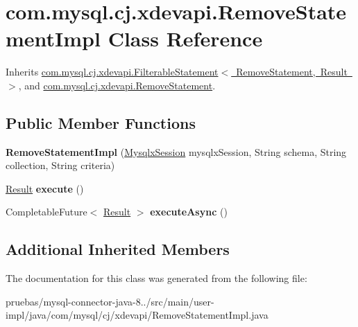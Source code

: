 \hypertarget{classcom_1_1mysql_1_1cj_1_1xdevapi_1_1_remove_statement_impl}{}\section{com.\+mysql.\+cj.\+xdevapi.\+Remove\+Statement\+Impl Class Reference}
\label{classcom_1_1mysql_1_1cj_1_1xdevapi_1_1_remove_statement_impl}


Inherits \mbox{\hyperlink{classcom_1_1mysql_1_1cj_1_1xdevapi_1_1_filterable_statement}{com.\+mysql.\+cj.\+xdevapi.\+Filterable\+Statement$<$ Remove\+Statement, Result $>$}}, and \mbox{\hyperlink{interfacecom_1_1mysql_1_1cj_1_1xdevapi_1_1_remove_statement}{com.\+mysql.\+cj.\+xdevapi.\+Remove\+Statement}}.

\subsection*{Public Member Functions}
\begin{DoxyCompactItemize}
\item 
\mbox{\label{classcom_1_1mysql_1_1cj_1_1xdevapi_1_1_remove_statement_impl_a0e5e4d0e84f24a40869bc4034d64c7b7}} 
{\bfseries Remove\+Statement\+Impl} (\mbox{\hyperlink{classcom_1_1mysql_1_1cj_1_1_mysqlx_session}{Mysqlx\+Session}} mysqlx\+Session, String schema, String collection, String criteria)
\item 
\mbox{\label{classcom_1_1mysql_1_1cj_1_1xdevapi_1_1_remove_statement_impl_aa364f7ecdcdf0a105229018ffe0bcc31}} 
\mbox{\hyperlink{interfacecom_1_1mysql_1_1cj_1_1xdevapi_1_1_result}{Result}} {\bfseries execute} ()
\item 
\mbox{\label{classcom_1_1mysql_1_1cj_1_1xdevapi_1_1_remove_statement_impl_a3f4fc42cc10759bca1c9221d132a6858}} 
Completable\+Future$<$ \mbox{\hyperlink{interfacecom_1_1mysql_1_1cj_1_1xdevapi_1_1_result}{Result}} $>$ {\bfseries execute\+Async} ()
\end{DoxyCompactItemize}
\subsection*{Additional Inherited Members}


The documentation for this class was generated from the following file\+:\begin{DoxyCompactItemize}
\item 
pruebas/mysql-\/connector-\/java-\/8../src/main/user-\/impl/java/com/mysql/cj/xdevapi/Remove\+Statement\+Impl.\+java\end{DoxyCompactItemize}
